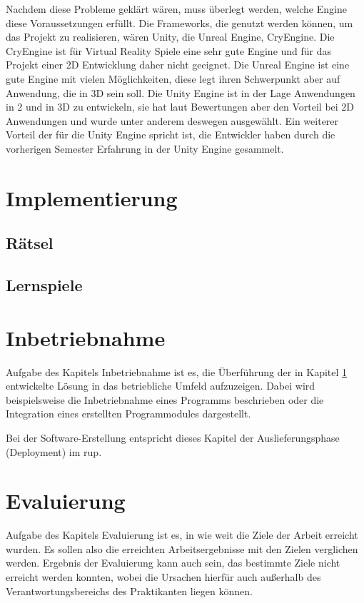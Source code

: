 Nachdem diese Probleme geklärt wären, muss überlegt werden, welche Engine diese Voraussetzungen erfüllt. Die Frameworks, die genutzt werden können, um das Projekt zu realisieren, wären Unity, die Unreal Engine, CryEngine. Die CryEngine ist für Virtual Reality Spiele eine sehr gute Engine und für das Projekt einer 2D Entwicklung daher nicht geeignet. Die Unreal Engine ist eine gute Engine mit vielen Möglichkeiten, diese legt ihren Schwerpunkt aber auf Anwendung, die in 3D sein soll. Die Unity Engine ist in der Lage Anwendungen in 2 und in 3D zu entwickeln, sie hat laut Bewertungen aber den Vorteil bei 2D Anwendungen und wurde unter anderem deswegen ausgewählt. Ein weiterer Vorteil der für die Unity Engine spricht ist, die Entwickler haben durch die vorherigen Semester Erfahrung in der Unity Engine gesammelt.
\chapter{Implementierung}
\label{cha:implementierung}

\section{Rätsel}
\label{sec:raetsel}

\newpage
\section{Lernspiele}
\label{sec:lernspiele}

\chapter{Inbetriebnahme}
\label{cha:inbetriebnahme}

Aufgabe des Kapitels Inbetriebnahme ist es, die Überführung der in 
Kapitel \ref{cha:implementierung} entwickelte Lösung in das betriebliche 
Umfeld aufzuzeigen. Dabei wird beispielsweise die Inbetriebnahme eines 
Programms beschrieben oder die Integration eines erstellten 
Programmodules dargestellt.

Bei der Software-Erstellung entspricht dieses Kapitel der 
Auslieferungsphase (Deployment) im \ac{rup}.

\chapter{Evaluierung}

Aufgabe des Kapitels Evaluierung ist es, in wie weit die Ziele der 
Arbeit erreicht wurden. Es sollen also die erreichten Arbeitsergebnisse 
mit den Zielen verglichen werden. Ergebnis der Evaluierung kann auch 
sein, das bestimmte Ziele nicht erreicht werden konnten, wobei die 
Ursachen hierfür auch außerhalb des Verantwortungsbereichs des 
Praktikanten liegen können.


